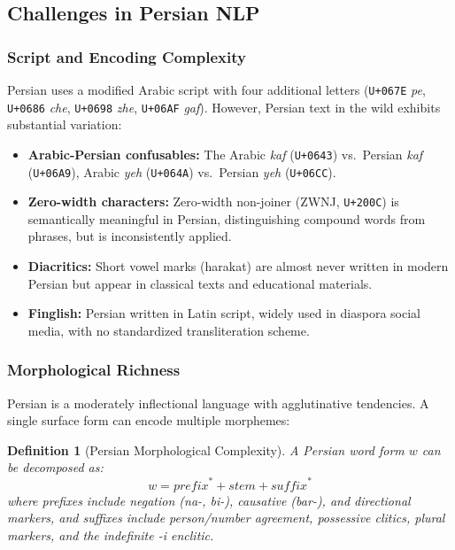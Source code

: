 \documentclass[11pt,a4paper]{article}
\newtheorem{definition}{Definition}
\begin{document}
\subsection{Challenges in Persian NLP}

\subsubsection{Script and Encoding Complexity}

Persian uses a modified Arabic script with four additional letters (\texttt{U+067E} \textit{pe}, \texttt{U+0686} \textit{che}, \texttt{U+0698} \textit{zhe}, \texttt{U+06AF} \textit{gaf}). However, Persian text in the wild exhibits substantial variation:

\begin{itemize}
    \item \textbf{Arabic-Persian confusables:} The Arabic \textit{kaf} (\texttt{U+0643}) vs.\ Persian \textit{kaf} (\texttt{U+06A9}), Arabic \textit{yeh} (\texttt{U+064A}) vs.\ Persian \textit{yeh} (\texttt{U+06CC}).
    \item \textbf{Zero-width characters:} Zero-width non-joiner (ZWNJ, \texttt{U+200C}) is semantically meaningful in Persian, distinguishing compound words from phrases, but is inconsistently applied.
    \item \textbf{Diacritics:} Short vowel marks (harakat) are almost never written in modern Persian but appear in classical texts and educational materials.
    \item \textbf{Finglish:} Persian written in Latin script, widely used in diaspora social media, with no standardized transliteration scheme.
\end{itemize}

\subsubsection{Morphological Richness}

Persian is a moderately inflectional language with agglutinative tendencies. A single surface form can encode multiple morphemes:

\begin{definition}[Persian Morphological Complexity]
A Persian word form $w$ can be decomposed as:
\begin{equation}
    w = \mathit{prefix}^* + \mathit{stem} + \mathit{suffix}^*
\end{equation}
where prefixes include negation (\textit{na-}, \textit{bi-}), causative (\textit{bar-}), and directional markers, and suffixes include person/number agreement, possessive clitics, plural markers, and the indefinite \textit{-i} enclitic.
\end{definition}
\end{document}

